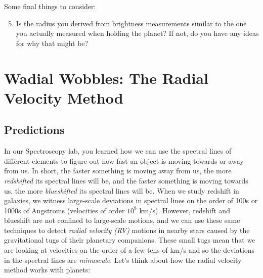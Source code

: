 \documentclass[11pt]{article}
\begin{document}
\medskip \noindent
Some final things to consider:
\begin{enumerate}
\setcounter{enumi}{4}
    \item Is the radius you derived from brightness measurements similar to the one you actually measured when holding the planet? If not, do you have any ideas for why that might be?
    
\end{enumerate}


\section{Wadial Wobbles: The Radial Velocity Method}
\subsection{Predictions} \label{sec:RV_predictions}

In our Spectroscopy lab, you learned how we can use the spectral lines of different elements to figure out how fast an object is moving towards or away from us.  In short, the faster something is moving away from us, the more \textit{redshifted} its spectral lines will be, and the faster something is moving towards us, the more \textit{blueshifted} its spectral lines will be.  When we study redshift in galaxies, we witness large-scale deviations in spectral lines on the order of 100s or 1000s of Angstroms (velocities of order $10^8$ km/s).  However, redshift and blueshift are not confined to large-scale motions, and we can use these same techniques to detect \textit{radial velocity (RV)} motions in nearby stars caused by the gravitational tugs of their planetary companions.  These small tugs mean that we are looking at velocities on the order of a few tens of km/s and so the deviations in the spectral lines are \textit{minuscule}. Let's think about how the radial velocity method works with planets:
\end{document}
